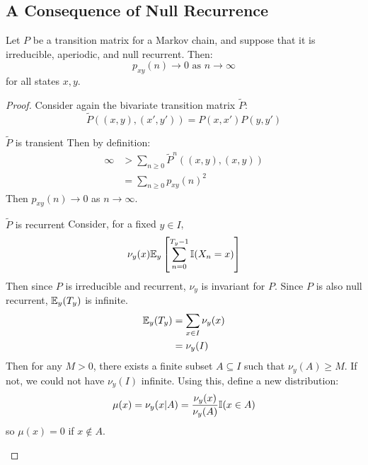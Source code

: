 \documentclass[../Main.tex]{subfiles}
\begin{document}
\subsection{A Consequence of Null Recurrence}
\begin{theorem}
    Let $P$ be a transition matrix for a Markov chain, and suppose that it is irreducible, aperiodic, and null recurrent. Then:
    \begin{equation*}
        p_{xy}(n) \to 0 \text{ as } n \to \infty
    \end{equation*}
    for all states $x, y$.
    \label{thmNullRecToZero}
\end{theorem}
\begin{proof}
    Consider again the bivariate transition matrix $\tilde{P}$:
    \begin{equation*}
        \tilde{P}((x, y), (x', y')) = P(x, x') P(y, y')
    \end{equation*}
    \begin{case}{$\tilde{P}$ is transient}
        Then by definition:
        \begin{align*}
            \infty &> \sum_{n \geq 0} \tilde{P}^n((x, y), (x, y)) \\
            &= \sum_{n \geq 0} p_{xy}(n)^2
        \end{align*}
        Then $p_{xy}(n) \to 0$ as $n \to \infty$.
    \end{case}
    \begin{case}{$\tilde{P}$ is recurrent}
        Consider, for a fixed $y \in I$,
        \begin{equation*}
            \nu_y(x) \mathbb{E}_y\left[\sum_{n=0}^{T_y-1} \mathbb{I}(X_n = x)\right]
        \end{equation*}
        Then since $P$ is irreducible and recurrent, $\nu_y$ is invariant for $P$. Since $P$ is also null recurrent, $\mathbb{E}_y(T_y)$ is infinite.
        \begin{align*}
            \mathbb{E}_y(T_y)&= \sum_{x \in I} \nu_y(x) \\
            &= \nu_y(I)
        \end{align*}
        Then for any $M > 0$, there exists a finite subset $A \subseteq I$ such that $\nu_y(A) \geq M$. If not, we could not have $\nu_y(I)$ infinite. Using this, define a new distribution:
        \begin{equation*}
            \mu(x) = \nu_y(x | A) = \frac{\nu_y(x)}{\nu_y(A)} \mathbb{I}(x \in A)
        \end{equation*}
        so $\mu(x) = 0$ if $x \notin A$.


\end{case}
\end{proof}
\end{document}
